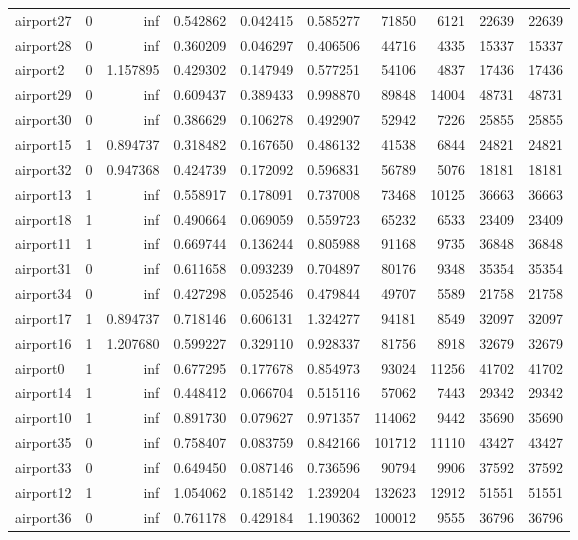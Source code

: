 \begin{longtable}{|l|r|r|r|r|r|r|r|r|r|}
airport27 & 0 & inf & 0.542862 & 0.042415 & 0.585277 & 71850 & 6121 & 22639 & 22639 \\
airport28 & 0 & inf & 0.360209 & 0.046297 & 0.406506 & 44716 & 4335 & 15337 & 15337 \\
airport2 & 0 & 1.157895 & 0.429302 & 0.147949 & 0.577251 & 54106 & 4837 & 17436 & 17436 \\
airport29 & 0 & inf & 0.609437 & 0.389433 & 0.998870 & 89848 & 14004 & 48731 & 48731 \\
airport30 & 0 & inf & 0.386629 & 0.106278 & 0.492907 & 52942 & 7226 & 25855 & 25855 \\
airport15 & 1 & 0.894737 & 0.318482 & 0.167650 & 0.486132 & 41538 & 6844 & 24821 & 24821 \\
airport32 & 0 & 0.947368 & 0.424739 & 0.172092 & 0.596831 & 56789 & 5076 & 18181 & 18181 \\
airport13 & 1 & inf & 0.558917 & 0.178091 & 0.737008 & 73468 & 10125 & 36663 & 36663 \\
airport18 & 1 & inf & 0.490664 & 0.069059 & 0.559723 & 65232 & 6533 & 23409 & 23409 \\
airport11 & 1 & inf & 0.669744 & 0.136244 & 0.805988 & 91168 & 9735 & 36848 & 36848 \\
airport31 & 0 & inf & 0.611658 & 0.093239 & 0.704897 & 80176 & 9348 & 35354 & 35354 \\
airport34 & 0 & inf & 0.427298 & 0.052546 & 0.479844 & 49707 & 5589 & 21758 & 21758 \\
airport17 & 1 & 0.894737 & 0.718146 & 0.606131 & 1.324277 & 94181 & 8549 & 32097 & 32097 \\
airport16 & 1 & 1.207680 & 0.599227 & 0.329110 & 0.928337 & 81756 & 8918 & 32679 & 32679 \\
airport0 & 1 & inf & 0.677295 & 0.177678 & 0.854973 & 93024 & 11256 & 41702 & 41702 \\
airport14 & 1 & inf & 0.448412 & 0.066704 & 0.515116 & 57062 & 7443 & 29342 & 29342 \\
airport10 & 1 & inf & 0.891730 & 0.079627 & 0.971357 & 114062 & 9442 & 35690 & 35690 \\
airport35 & 0 & inf & 0.758407 & 0.083759 & 0.842166 & 101712 & 11110 & 43427 & 43427 \\
airport33 & 0 & inf & 0.649450 & 0.087146 & 0.736596 & 90794 & 9906 & 37592 & 37592 \\
airport12 & 1 & inf & 1.054062 & 0.185142 & 1.239204 & 132623 & 12912 & 51551 & 51551 \\
airport36 & 0 & inf & 0.761178 & 0.429184 & 1.190362 & 100012 & 9555 & 36796 & 36796 \\

\end{longtable}
